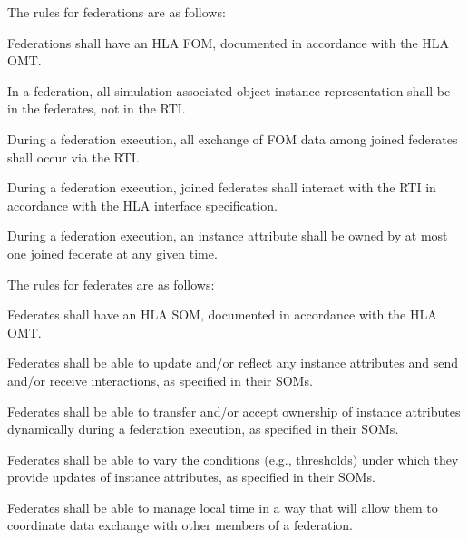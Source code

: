 
\newpage
\enlargethispage{4pt}

The rules for federations are as follows:

\begin{hlarules}
    \item Federations shall have an HLA FOM, documented in accordance with the HLA OMT.
    \item In a federation, all simulation-associated object instance representation shall be in the\linebreak
    federates, not in the RTI.
    \item During a federation execution, all exchange of FOM data among joined federates shall occur\linebreak
    via the RTI.
    \item During a federation execution, joined federates shall interact with the RTI in accordance with\linebreak
    the HLA interface specification.
    \item During a federation execution, an instance attribute shall be owned by at most one joined\linebreak
    federate at any given time.
\end{hlarules}

The rules for federates are as follows:

\begin{hlarules}
    \setcounter{enumi}{5}
    \item Federates shall have an HLA SOM, documented in accordance with the HLA OMT.
    \item Federates shall be able to update and/or reflect any instance attributes and send and/or receive\linebreak
    interactions, as specified in their SOMs.
    \item Federates shall be able to transfer and/or accept ownership of instance attributes dynamically\linebreak
    during a federation execution, as specified in their SOMs.
    \item Federates shall be able to vary the conditions (e.g., thresholds) under which they provide\linebreak
    updates of instance attributes, as specified in their SOMs.
    \item Federates shall be able to manage local time in a way that will allow them to coordinate data\linebreak
    exchange with other members of a federation.
\end{hlarules}
